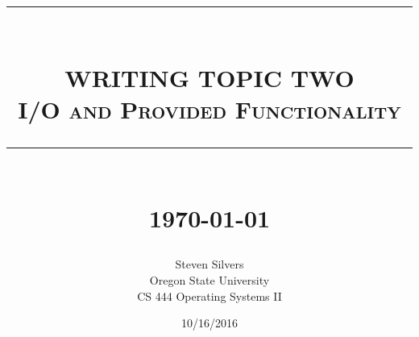 \documentclass[10pt,serif,draftclsnofoot,onecolumn]{IEEEtran}
\newcommand{\HRule}[1]{\rule{\linewidth}{#1}}
\begin{document}
	\begin{titlepage}


	\title{ \normalsize \textsc{}
			\\ [2.0cm]
			\HRule{0.5pt} \\
			\LARGE \textbf{\uppercase{Writing topic two}}
			\\ \normalsize \textsc{I/O and Provided Functionality}
			\HRule{2pt} \\ [0.5cm]
			\normalsize \today \vspace*{5\baselineskip}}
	\date{10/16/2016}
	
	\author{Steven Silvers \\
			Oregon State University \\
			CS 444 Operating Systems II}
	\maketitle
	\end{titlepage}
	\newpage
\end{document}
